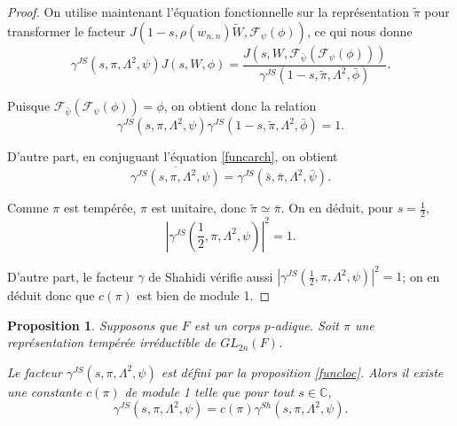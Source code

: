 \documentclass{amsart}
\newtheorem{proposition}{Proposition}[section]
\begin{document}
\begin{proof}
 On utilise maintenant l'équation fonctionnelle sur la représentation $\tilde{\pi}$ pour transformer le facteur $J(1-s, \rho(w_{n,n})\tilde{W}, \mathcal{F}_\psi(\phi))$, ce qui nous donne
 \begin{equation}
 \gamma^{JS}(s, \pi, \Lambda^2, \psi) J(s, W, \phi) = \frac{J(s, W, \mathcal{F}_{\bar{\psi}}(\mathcal{F}_\psi(\phi)))}{\gamma^{JS}(1-s, \tilde{\pi}, \Lambda^2, \bar{\phi})}.
 \end{equation}
 
 Puisque $\mathcal{F}_{\bar{\psi}}(\mathcal{F}_\psi(\phi)) = \phi$, on obtient donc la relation 
 \begin{equation}
 \gamma^{JS}(s, \pi, \Lambda^2, \psi)\gamma^{JS}(1-s, \tilde{\pi}, \Lambda^2, \bar{\phi}) = 1.
 \end{equation}
 
 D'autre part, en conjuguant l'équation \ref{funcarch}, on obtient
 \begin{equation}
 \overline{\gamma^{JS}(s, \pi, \Lambda^2, \psi)} = \gamma^{JS}(\bar{s}, \bar{\pi}, \Lambda^2, \bar{\psi}).
 \end{equation}
 
 Comme $\pi$ est tempérée, $\pi$ est unitaire, donc $\tilde{\pi} \simeq \bar{\pi}$. On en déduit, pour $s = \frac{1}{2}$,
 \begin{equation}
 |\gamma^{JS}(\frac{1}{2}, \pi, \Lambda^2, \psi)|^2=1.
 \end{equation}
 
 D'autre part, le facteur $\gamma$ de Shahidi vérifie aussi $|\gamma^{JS}(\frac{1}{2}, \pi, \Lambda^2, \psi)|^2=1$; on en déduit donc que $c(\pi)$ est bien de module 1.
 \end{proof}
 
 \begin{proposition}
 Supposons que $F$ est un corps $p$-adique. Soit $\pi$ une représentation tempérée irréductible de $GL_{2n}(F)$. 
 
 Le facteur $\gamma^{JS}(s,\pi,\Lambda^2,\psi)$ est défini par la proposition \ref{funcloc}. Alors il existe une constante $c(\pi)$ de module 1 telle que pour tout $s \in \mathbb{C}$,
 \begin{equation}
 \gamma^{JS}(s, \pi, \Lambda^2, \psi) = c(\pi)\gamma^{Sh}(s, \pi, \Lambda^2, \psi).
 \end{equation}
 \end{proposition}
 
\end{document}
